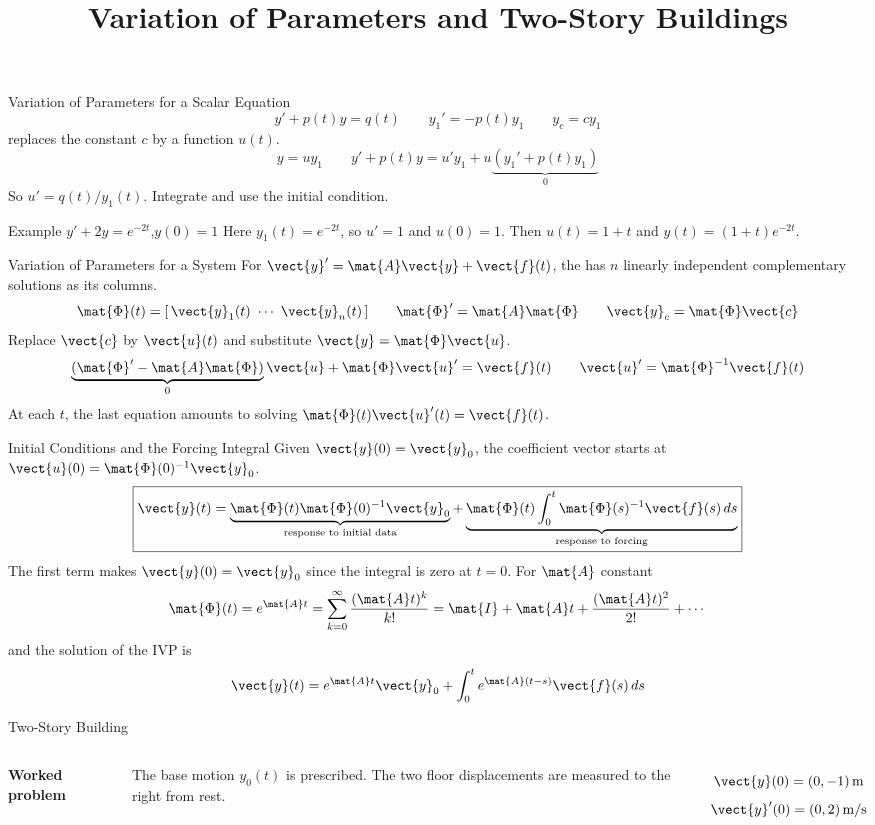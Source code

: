 \documentclass[11pt,aspectratio=169]{beamer}
\title{Variation of Parameters and Two-Story Buildings}
\date{}
\begin{document}
\begin{frame}{Variation of Parameters for a Scalar Equation}
\[
  y'+p(t)y=q(t)
  \qquad
  y_1'=-p(t)y_1
  \qquad
  y_c=cy_1
\]
 replaces the constant $c$ by a function $u(t)$.
\[
  y=uy_1
  \qquad
  y'+p(t)y=u'y_1+u\underbrace{(y_1'+p(t)y_1)}_{0}
\]
So $u'=q(t)/y_1(t)$. Integrate and use the initial condition.

\begin{block}{Example \quad $y'+2y=e^{-2t}$,\quad $y(0)=1$}
Here $y_1(t)=e^{-2t}$, so $u'=1$ and $u(0)=1$.
Then $u(t)=1+t$ and $y(t)=(1+t)e^{-2t}$.
\end{block}
\end{frame}

\begin{frame}{Variation of Parameters for a System}
For $\vect{y}'=\mat{A}\vect{y}+\vect{f}(t)$, the
 has $n$ linearly independent complementary solutions as its columns.
\[
  \mat{\Phi}(t)=[\,\vect{y}_1(t)\ \cdots\ \vect{y}_n(t)\,]
  \qquad
  \mat{\Phi}'=\mat{A}\mat{\Phi}
  \qquad
  \vect{y}_c=\mat{\Phi}\vect{c}
\]
Replace $\vect{c}$ by $\vect{u}(t)$ and substitute $\vect{y}=\mat{\Phi}\vect{u}$.
\[
  \underbrace{(\mat{\Phi}'-\mat{A}\mat{\Phi})}_{0}\vect{u}
  +\mat{\Phi}\vect{u}'=\vect{f}(t)
  \qquad
  \vect{u}'=\mat{\Phi}^{-1}\vect{f}(t)
\]
At each $t$, the last equation amounts to solving
$\mat{\Phi}(t)\vect{u}'(t)=\vect{f}(t)$.
\end{frame}

\begin{frame}{Initial Conditions and the Forcing Integral}
Given $\vect{y}(0)=\vect{y}_0$, the coefficient vector starts at
$\vect{u}(0)=\mat{\Phi}(0)^{-1}\vect{y}_0$.
\[
  \boxed{\vect{y}(t)=
    \underbrace{\mat{\Phi}(t)\mat{\Phi}(0)^{-1}\vect{y}_0}_{\text{response to initial data}}
    +\underbrace{\mat{\Phi}(t)\int_0^t\mat{\Phi}(s)^{-1}\vect{f}(s)\,ds}_{\text{response to forcing}}}
\]
The first term makes $\vect{y}(0)=\vect{y}_0$ since the integral is zero at $t=0$. 
For $\mat{A}$ constant
\[
  \mat{\Phi}(t) = e^{\mat{A}t}=\sum_{k=0}^{\infty}\frac{(\mat{A}t)^k}{k!}
    =\mat{I}+\mat{A}t+\frac{(\mat{A}t)^2}{2!}+\cdots
\]
and the solution of the IVP is
\[
  \vect{y}(t)=e^{\mat{A}t}\vect{y}_0
    +\int_0^t e^{\mat{A}(t-s)}\vect{f}(s)\,ds
\]
\end{frame}

\begin{frame}{Two-Story Building}
\begin{columns}[c,onlytextwidth]
  \resizebox{\linewidth}{!}{\TwoStoryBuilding{}}
  \textbf{Worked problem}

  \medskip
  The base motion $y_0(t)$ is prescribed. The two floor displacements are
  measured to the right from rest.

  \[
    \vect{y}(0)=(0,-1)\,\mathrm{m}
  \]
  \[
    \vect{y}'(0)=(0,2)\,\mathrm{m/s}
  \]
\end{columns}
\end{frame}
\end{document}
